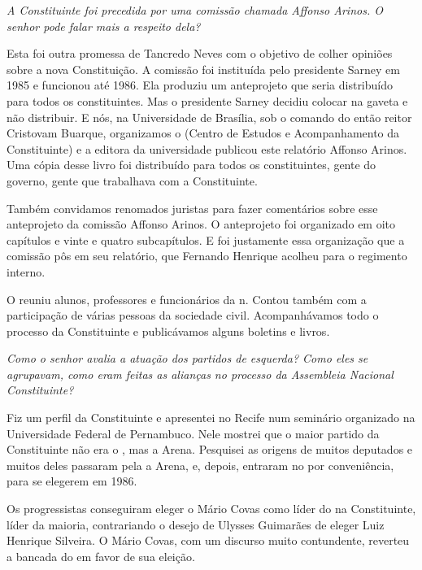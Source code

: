 \medskip

\noindent\emph{A Constituinte foi precedida por uma comissão chamada Affonso
Arinos. O senhor pode falar mais a respeito dela?}

Esta foi outra promessa de Tancredo Neves com o
objetivo de colher opiniões sobre a nova Constituição. A comissão foi
instituída pelo presidente Sarney em 1985 e funcionou até 1986. Ela
produziu um anteprojeto que seria distribuído para todos os
constituintes. Mas o presidente Sarney decidiu colocar na gaveta e não
distribuir. E nós, na Universidade de Brasília, sob o comando do então
reitor Cristovam Buarque, organizamos o  (Centro de Estudos e
Acompanhamento da Constituinte) e a editora da universidade publicou
este relatório Affonso Arinos. Uma cópia desse livro foi distribuído
para todos os constituintes, gente do governo, gente que trabalhava com
a Constituinte.

Também convidamos renomados juristas para fazer comentários sobre esse
anteprojeto da comissão Affonso Arinos. O anteprojeto foi organizado em
oito capítulos e vinte e quatro subcapítulos. E foi justamente essa
organização que a comissão pôs em seu relatório, que Fernando Henrique
acolheu para o regimento interno.

O  reuniu alunos, professores e funcionários da n. Contou também
com a participação de várias pessoas da sociedade civil. Acompanhávamos
todo o processo da Constituinte e publicávamos alguns boletins e livros.

\medskip

\noindent\emph{Como o senhor avalia a atuação dos partidos de esquerda? Como
eles se agrupavam, como eram feitas as alianças no processo da
Assembleia Nacional Constituinte?}

Fiz um perfil da Constituinte e apresentei no Recife
num seminário organizado na Universidade Federal de Pernambuco. Nele
mostrei que o maior partido da Constituinte não era o , mas a Arena.
Pesquisei as origens de muitos deputados e muitos deles passaram pela a
Arena,  e, depois, entraram no  por conveniência, para se
elegerem em 1986.

Os progressistas conseguiram eleger o Mário Covas como líder do  na
Constituinte, líder da maioria, contrariando o desejo de Ulysses
Guimarães de eleger Luiz Henrique Silveira. O Mário Covas, com um
discurso muito contundente, reverteu a bancada do  em favor de sua
eleição.


